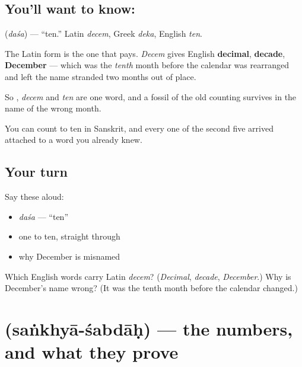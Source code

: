 \subsection*{You'll want to know: }
\textbf{} (\emph{daśa}) — \textquotedblleft{}ten.\textquotedblright{} Latin \emph{decem}, Greek \emph{deka}, English \emph{ten}.

The Latin form is the one that pays. \emph{Decem} gives English \textbf{decimal}, \textbf{decade}, \textbf{December} — which was the \emph{tenth} month before the calendar was rearranged and left the name stranded two months out of place.

So , \emph{decem} and \emph{ten} are one word, and a fossil of the old counting survives in the name of the wrong month.

\begin{grammarlens}[title={What you've built}]
You can count to ten in Sanskrit, and every one of the second five arrived attached to a word you already knew.
\end{grammarlens}

\subsection*{Your turn}
Say these aloud:

\begin{itemize}
\raggedright
  \item \emph{daśa} — \textquotedblleft{}ten\textquotedblright{}
  \item one to ten, straight through
  \item why December is misnamed
\end{itemize}

\begin{tcolorbox}[breakable,colback=teal!4,colframe=teal!35!black,title={Before you move on}]
Which English words carry Latin \emph{decem}? (\emph{Decimal}, \emph{decade}, \emph{December}.) Why is December's name wrong? (It was the tenth month before the calendar changed.)
\end{tcolorbox}
\section[\texorpdfstring{\sk{सङ्ख्याशब्दाः} (saṅkhyā-śabdāḥ)}{सङ्ख्याशब्दाः (saṅkhyā-śabdāḥ)}]{ (saṅkhyā-śabdāḥ) — the numbers, and what they prove}

\label{lesson:SA-C19-number-family}




